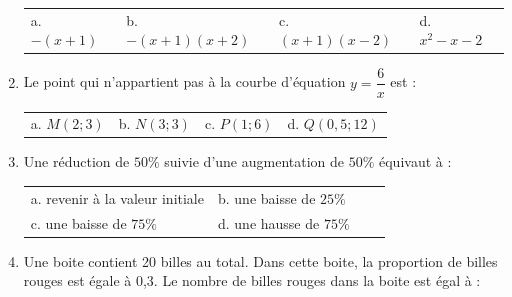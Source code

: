 \documentclass{article}
\begin{document}
\begin{enumerate}[left=0pt,itemsep=10pt]
\begin{tabular}{l@{\qquad}l@{\qquad}l@{\qquad}l}

a. $-(x+1)$ & b. $-(x+1)(x+2)$ & c. $(x+1)(x-2)$ & d. $x^2-x-2$ \\

\end{tabular}





\vspace{0,8cm}



\item Le point qui n'appartient pas à la courbe d'équation $y=\dfrac{6}{x}$ est : \\

\begin{tabular}{l@{\qquad}l@{\qquad}l@{\qquad}l}

a. $M(2;3)$ & b. $N(3;3)$ & c. $P(1;6)$ & d. $Q(0,5;12)$ \\

\end{tabular}



\vspace{0,8cm}



\item Une réduction de $50\%$ suivie d'une augmentation de $50\%$ équivaut à : \\

\begin{tabular}{l@{\qquad}l@{\qquad}l@{\qquad}l}

a. revenir à la valeur initiale & b. une baisse de $25\%$ & \\ c. une baisse de $75\%$ & d. une hausse de $75\%$ \\

\end{tabular}



\vspace{0,8cm}



\item Une boite contient 20 billes au total. Dans cette boite, la proportion de billes rouges est égale à 0,3. Le nombre de billes rouges dans la boite est égal à : \\

\begin{tabular}{l@{\qquad}l@{\qquad}l@{\qquad}l}


\end{tabular}
\end{enumerate}
\end{document}

